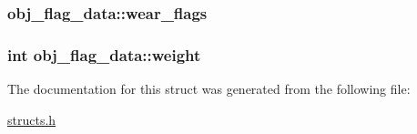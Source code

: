 \hypertarget{structobj__flag__data_a23018dd0bbb80c771ca335cba31d968c}{
\subsubsection[{wear\-\_\-flags}]{ obj\-\_\-flag\-\_\-data\-::wear\-\_\-flags}}\label{structobj__flag__data_a23018dd0bbb80c771ca335cba31d968c}
\hypertarget{structobj__flag__data_a066008057439b4c23919acea5c646741}{
\subsubsection[{weight}]{\setlength{\rightskip}{0pt plus 5cm}int obj\-\_\-flag\-\_\-data\-::weight}}\label{structobj__flag__data_a066008057439b4c23919acea5c646741}


The documentation for this struct was generated from the following file\-:\begin{DoxyCompactItemize}
\item 
\hyperlink{structs_8h}{structs.\-h}\end{DoxyCompactItemize}
